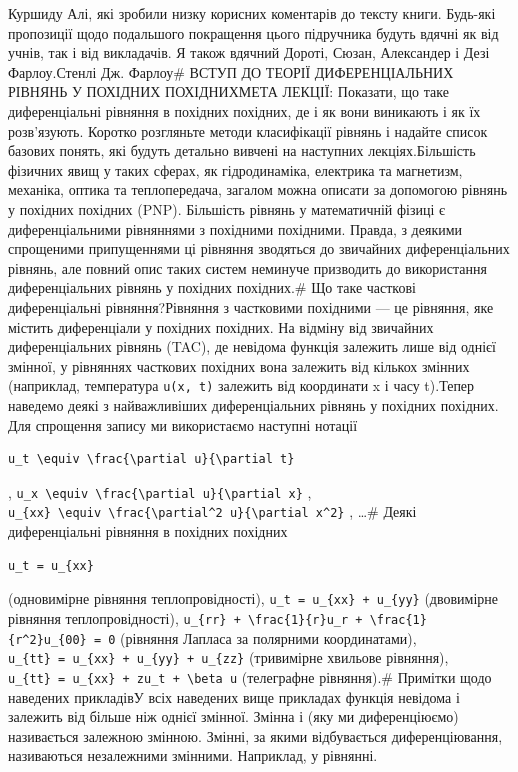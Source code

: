 \documentclass[
  ukrainian,
]{article}
\begin{document}
Куршиду Алі, які зробили низку корисних коментарів до тексту книги.
Будь-які пропозиції щодо подальшого покращення цього підручника будуть
вдячні як від учнів, так і від викладачів. Я також вдячний Дороті,
Сюзан, Александер і Дезі Фарлоу.Стенлі Дж. Фарлоу\# ВСТУП ДО ТЕОРІЇ
ДИФЕРЕНЦІАЛЬНИХ РІВНЯНЬ У ПОХІДНИХ ПОХІДНИХМЕТА ЛЕКЦІЇ: Показати, що
таке диференціальні рівняння в похідних похідних, де і як вони виникають
і як їх розв'язують. Коротко розгляньте методи класифікації рівнянь і
надайте список базових понять, які будуть детально вивчені на наступних
лекціях.Більшість фізичних явищ у таких сферах, як гідродинаміка,
електрика та магнетизм, механіка, оптика та теплопередача, загалом можна
описати за допомогою рівнянь у похідних похідних (PNP). Більшість
рівнянь у математичній фізиці є диференціальними рівняннями з похідними
похідними. Правда, з деякими спрощеними припущеннями ці рівняння
зводяться до звичайних диференціальних рівнянь, але повний опис таких
систем неминуче призводить до використання диференціальних рівнянь у
похідних похідних.\# Що таке часткові диференціальні рівняння?Рівняння з
частковими похідними --- це рівняння, яке містить диференціали у
похідних похідних. На відміну від звичайних диференціальних рівнянь
(TAC), де невідома функція залежить лише від однієї змінної, у рівняннях
часткових похідних вона залежить від кількох змінних (наприклад,
температура \texttt{u(x,\ t)} залежить від координати x і часу t).Тепер
наведемо деякі з найважливіших диференціальних рівнянь у похідних
похідних. Для спрощення запису ми використаємо наступні нотації

\begin{verbatim}
u_t \equiv \frac{\partial u}{\partial t}
\end{verbatim}

,
\texttt{u\_x\ \textbackslash{}equiv\ \textbackslash{}frac\{\textbackslash{}partial\ u\}\{\textbackslash{}partial\ x\}}
,
\texttt{u\_\{xx\}\ \textbackslash{}equiv\ \textbackslash{}frac\{\textbackslash{}partial\^{}2\ u\}\{\textbackslash{}partial\ x\^{}2\}}
, \ldots\# Деякі диференціальні рівняння в похідних похідних

\begin{verbatim}
u_t = u_{xx}
\end{verbatim}

(одновимірне рівняння теплопровідності),
\texttt{u\_t\ =\ u\_\{xx\}\ +\ u\_\{yy\}} (двовимірне рівняння
теплопровідності),
\texttt{u\_\{rr\}\ +\ \textbackslash{}frac\{1\}\{r\}u\_r\ +\ \textbackslash{}frac\{1\}\{r\^{}2\}u\_\{00\}\ =\ 0}
(рівняння Лапласа за полярними координатами),
\texttt{u\_\{tt\}\ =\ u\_\{xx\}\ +\ u\_\{yy\}\ +\ u\_\{zz\}} (тривимірне
хвильове рівняння),
\texttt{u\_\{tt\}\ =\ u\_\{xx\}\ +\ zu\_t\ +\ \textbackslash{}beta\ u}
(телеграфне рівняння).\# Примітки щодо наведених прикладівУ всіх
наведених вище прикладах функція невідома і залежить від більше ніж
однієї змінної. Змінна і (яку ми диференціюємо) називається залежною
змінною. Змінні, за якими відбувається диференціювання, називаються
незалежними змінними. Наприклад, у рівнянні.
\end{document}
